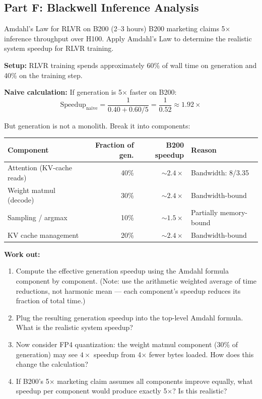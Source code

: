 \subsection{Part F: Blackwell Inference Analysis}

\begin{exercise}{Amdahl's Law for RLVR on B200 (2--3 hours)}
B200 marketing claims 5$\times$ inference throughput over H100. Apply Amdahl's Law to determine the realistic system speedup for RLVR training.

\textbf{Setup:} RLVR training spends approximately 60\% of wall time on generation and 40\% on the training step.

\textbf{Naive calculation:} If generation is 5$\times$ faster on B200:
$$\text{Speedup}_{\text{naive}} = \frac{1}{0.40 + 0.60/5} = \frac{1}{0.52} \approx 1.92\times$$

But generation is not a monolith. Break it into components:

\begin{center}
\begin{tabular}{lrrl}
\hline
\textbf{Component} & \textbf{Fraction of gen.} & \textbf{B200 speedup} & \textbf{Reason} \\
\hline
Attention (KV-cache reads) & 40\% & $\sim 2.4\times$ & Bandwidth: 8/3.35 \\
Weight matmul (decode) & 30\% & $\sim 2.4\times$ & Bandwidth-bound \\
Sampling / argmax & 10\% & $\sim 1.5\times$ & Partially memory-bound \\
KV cache management & 20\% & $\sim 2.4\times$ & Bandwidth-bound \\
\hline
\end{tabular}
\end{center}

\textbf{Work out:}
\begin{enumerate}
  \item Compute the effective generation speedup using the Amdahl formula component by component. (Note: use the arithmetic weighted average of time reductions, not harmonic mean --- each component's speedup reduces its fraction of total time.)
  \item Plug the resulting generation speedup into the top-level Amdahl formula. What is the realistic system speedup?
  \item Now consider FP4 quantization: the weight matmul component (30\% of generation) may see $4\times$ speedup from 4$\times$ fewer bytes loaded. How does this change the calculation?
  \item If B200's 5$\times$ marketing claim assumes all components improve equally, what speedup per component would produce exactly 5$\times$? Is this realistic?
\end{enumerate}


\end{exercise}
